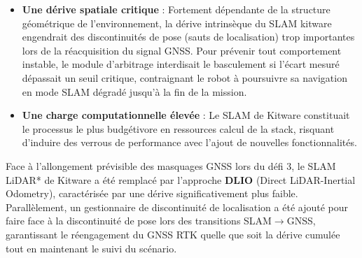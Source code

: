 \begin{itemize}
    \item \textbf{Une dérive spatiale critique} : Fortement dépendante de la structure géométrique de l'environnement, la dérive intrinsèque du SLAM kitware engendrait des discontinuités de pose (sauts de localisation) trop importantes lors de la réacquisition du signal GNSS. Pour prévenir tout comportement instable, le module d'arbitrage interdisait le basculement si l'écart mesuré dépassait un seuil critique, contraignant le robot à poursuivre sa navigation en mode SLAM dégradé jusqu'à la fin de la mission.
    \item \textbf{Une charge computationnelle élevée} : Le SLAM de Kitware constituait le processus le plus budgétivore en ressources calcul de la stack, risquant d'induire des verrous de performance avec l'ajout de nouvelles fonctionnalités.\\
\end{itemize}

Face à l'allongement prévisible des masquages GNSS lors du défi 3, le SLAM LiDAR* de Kitware a été remplacé par l'approche \textbf{DLIO} (Direct LiDAR-Inertial Odometry), caractérisée par une dérive significativement plus faible. Parallèlement, un gestionnaire de discontinuité de localisation a été ajouté pour faire face à la discontinuité de pose lors des transitions SLAM$\rightarrow$GNSS, garantissant le réengagement du GNSS RTK quelle que soit la dérive cumulée tout en maintenant le suivi du scénario.\\

